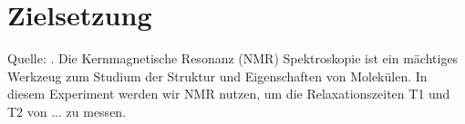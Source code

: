 \section{Zielsetzung}
\label{sec:Zielsetzung}
Quelle: \cite{Anleitung}.
Die Kernmagnetische Resonanz (NMR) Spektroskopie ist ein mächtiges Werkzeug zum Studium der Struktur und Eigenschaften von Molekülen. In diesem Experiment werden wir NMR nutzen, um die Relaxationszeiten T1 und T2 von ... zu messen.